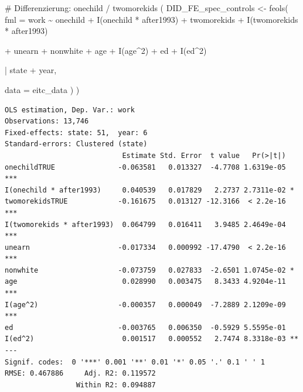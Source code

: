 \documentclass[
  a4paper,
  DIV=11,
  oneside]{scrreprt}
\newenvironment{Shaded}{\begin{snugshade}}{\end{snugshade}}
\newcommand{\AttributeTok}[1]{\textcolor[rgb]{0.40,0.45,0.13}{#1}}
\newcommand{\CommentTok}[1]{\textcolor[rgb]{0.37,0.37,0.37}{#1}}
\newcommand{\DecValTok}[1]{\textcolor[rgb]{0.68,0.00,0.00}{#1}}
\newcommand{\FunctionTok}[1]{\textcolor[rgb]{0.28,0.35,0.67}{#1}}
\newcommand{\NormalTok}[1]{\textcolor[rgb]{0.00,0.23,0.31}{#1}}
\newcommand{\OtherTok}[1]{\textcolor[rgb]{0.00,0.23,0.31}{#1}}
\newcommand{\SpecialCharTok}[1]{\textcolor[rgb]{0.37,0.37,0.37}{#1}}
\begin{document}
\begin{Shaded}
\begin{Highlighting}[]
\CommentTok{\# Differenzierung: onechild / twomorekids}
\NormalTok{(}
\NormalTok{  DID\_FE\_spec\_controls }\OtherTok{\textless{}{-}} \FunctionTok{feols}\NormalTok{(}
    \AttributeTok{fml =}\NormalTok{ work }\SpecialCharTok{\textasciitilde{}} 
\NormalTok{      onechild }\SpecialCharTok{+} \FunctionTok{I}\NormalTok{(onechild }\SpecialCharTok{*}\NormalTok{ after1993) }
    \SpecialCharTok{+}\NormalTok{ twomorekids }\SpecialCharTok{+} \FunctionTok{I}\NormalTok{(twomorekids }\SpecialCharTok{*}\NormalTok{ after1993) }
    
    \SpecialCharTok{+}\NormalTok{ unearn }\SpecialCharTok{+}\NormalTok{ nonwhite }
    \SpecialCharTok{+}\NormalTok{ age }\SpecialCharTok{+} \FunctionTok{I}\NormalTok{(age}\SpecialCharTok{\^{}}\DecValTok{2}\NormalTok{)}
    \SpecialCharTok{+}\NormalTok{ ed }\SpecialCharTok{+} \FunctionTok{I}\NormalTok{(ed}\SpecialCharTok{\^{}}\DecValTok{2}\NormalTok{)}
    
    \SpecialCharTok{|}\NormalTok{ state }\SpecialCharTok{+}\NormalTok{ year,}
    
    \AttributeTok{data =}\NormalTok{ eitc\_data}
\NormalTok{  )}
\NormalTok{)}
\end{Highlighting}
\end{Shaded}

\begin{verbatim}
OLS estimation, Dep. Var.: work
Observations: 13,746
Fixed-effects: state: 51,  year: 6
Standard-errors: Clustered (state) 
                            Estimate Std. Error  t value   Pr(>|t|)    
onechildTRUE               -0.063581   0.013327  -4.7708 1.6319e-05 ***
I(onechild * after1993)     0.040539   0.017829   2.2737 2.7311e-02 *  
twomorekidsTRUE            -0.161675   0.013127 -12.3166  < 2.2e-16 ***
I(twomorekids * after1993)  0.064799   0.016411   3.9485 2.4649e-04 ***
unearn                     -0.017334   0.000992 -17.4790  < 2.2e-16 ***
nonwhite                   -0.073759   0.027833  -2.6501 1.0745e-02 *  
age                         0.028990   0.003475   8.3433 4.9204e-11 ***
I(age^2)                   -0.000357   0.000049  -7.2889 2.1209e-09 ***
ed                         -0.003765   0.006350  -0.5929 5.5595e-01    
I(ed^2)                     0.001517   0.000552   2.7474 8.3318e-03 ** 
---
Signif. codes:  0 '***' 0.001 '**' 0.01 '*' 0.05 '.' 0.1 ' ' 1
RMSE: 0.467886     Adj. R2: 0.119572
                 Within R2: 0.094887
\end{verbatim}
\end{document}
